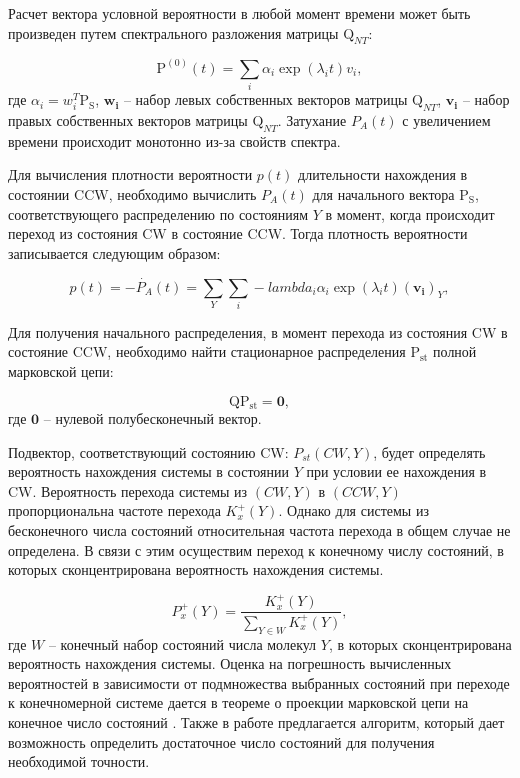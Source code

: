 Расчет вектора условной вероятности в любой момент времени может быть произведен путем спектрального разложения матрицы $\boldsymbol{\mathrm{Q}}_{NT}$:

\begin{equation}
    \boldsymbol{\mathrm{P}}^{(0)}(t) = \sum_i \alpha_i \exp(\lambda_i t) v_i,
    \label{eq:solution-no-transition-prob}
\end{equation}
где $\alpha_i=w_i^T \boldsymbol{\mathrm{P_S}}$, $\boldsymbol{w_i}$ -- набор левых собственных векторов матрицы $\boldsymbol{\mathrm{Q}}_{NT}$, $\boldsymbol{v_i}$ -- набор правых собственных векторов матрицы $\boldsymbol{\mathrm{Q}}_{NT}$. Затухание $P_A(t)$ с увеличением времени происходит монотонно из-за свойств спектра.

Для вычисления плотности вероятности $p(t)$ длительности нахождения в состоянии CCW, необходимо вычислить $P_A(t)$ для начального вектора $\boldsymbol{\mathrm{P_S}}$, соответствующего распределению по состояниям $Y$ в момент, когда происходит переход из состояния CW в состояние CCW.
Тогда плотность вероятности записывается следующим образом:

\begin{equation}
    p(t) = -\dot{P_A}(t) = \sum_Y \sum_i -lambda_i \alpha_i \exp(\lambda_i t) (\boldsymbol{v_i})_Y,
    \label{eq:solution-no-transition-pdf}
\end{equation}

Для получения начального распределения, в момент перехода из состояния CW в состояние CCW, необходимо найти стационарное распределения $\boldsymbol{\mathrm{P_{st}}}$ полной марковской цепи:

\begin{equation}
    \boldsymbol{\mathrm{Q}} \boldsymbol{\mathrm{P_{st}}} = \boldsymbol{0},
    \label{eq:transitions-stationary}
\end{equation}
где $\boldsymbol{0}$ -- нулевой полубесконечный вектор.

Подвектор, соответствующий состоянию CW: ${P_{st}(CW, Y)}$, будет определять вероятность нахождения системы в состоянии $Y$ при условии ее нахождения в CW. Вероятность перехода системы из $(CW, Y)$ в $(CCW, Y)$ пропорциональна частоте перехода $K_x^+(Y)$. Однако для системы из бесконечного числа состояний относительная частота перехода в общем случае не определена. В связи с этим осуществим переход к конечному числу состояний, в которых сконцентрирована вероятность нахождения системы. 

\begin{equation}
    P_x^+(Y)=\frac{K_x^+(Y)}{\sum_{Y\in W} K_x^+(Y)},
    \label{eq:cw-to-ccw-prob}
\end{equation}
где $W$ -- конечный набор состояний числа молекул $Y$, в которых сконцентрирована вероятность нахождения системы. Оценка на погрешность вычисленных вероятностей в зависимости от подмножества выбранных состояний при переходе к конечномерной системе дается в теореме о проекции марковской цепи на конечное число состояний \cite{}. Также в работе предлагается алгоритм, который дает возможность определить достаточное число состояний для получения необходимой точности.

